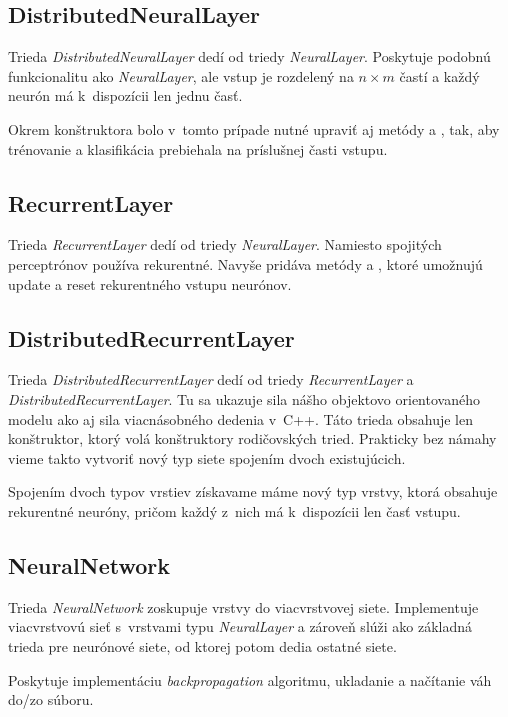 \subsection{DistributedNeuralLayer}
Trieda \textit{DistributedNeuralLayer} dedí od triedy \textit{NeuralLayer}. Poskytuje podobnú funkcionalitu ako \textit{NeuralLayer}, ale vstup je rozdelený na $n\times m$ častí a každý neurón má k~dispozícii len jednu časť. 

Okrem konštruktora bolo v~tomto prípade nutné upraviť aj metódy  a , tak, aby trénovanie a klasifikácia prebiehala na príslušnej časti vstupu.

\subsection{RecurrentLayer}
Trieda \textit{RecurrentLayer} dedí od triedy \textit{NeuralLayer}. Namiesto spojitých perceptrónov používa rekurentné. Navyše pridáva metódy  a , ktoré umožnujú update a reset rekurentného vstupu neurónov.

\subsection{DistributedRecurrentLayer}
Trieda \textit{DistributedRecurrentLayer} dedí od triedy \textit{RecurrentLayer} a \textit{DistributedRecurrentLayer}. Tu sa ukazuje sila nášho objektovo orientovaného modelu ako aj sila viacnásobného dedenia v~C++. Táto trieda obsahuje len konštruktor, ktorý volá konštruktory rodičovských tried. Prakticky bez námahy vieme takto vytvoriť nový typ siete spojením dvoch existujúcich.

Spojením dvoch typov vrstiev získavame máme nový typ vrstvy, ktorá obsahuje rekurentné neuróny, pričom každý z~nich má k~dispozícii len časť vstupu.

\subsection{NeuralNetwork}
Trieda \textit{NeuralNetwork} zoskupuje vrstvy do viacvrstvovej siete. Implementuje viacvrstvovú sieť s~vrstvami typu \textit{NeuralLayer} a zároveň slúži ako základná trieda pre neurónové siete, od ktorej potom dedia ostatné siete.

Poskytuje implementáciu \textit{backpropagation} algoritmu, ukladanie a načítanie váh do/zo súboru. 

